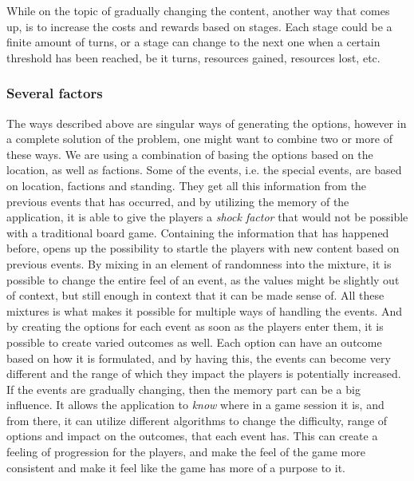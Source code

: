 While on the topic of gradually changing the content, another way that comes up, is to increase the costs and rewards based on stages.
Each stage could be a finite amount of turns, or a stage can change to the next one when a certain threshold has been reached, be it turns, resources gained, resources lost, etc.

\subsubsection{Several factors}
The ways described above are singular ways of generating the options, however in a complete solution of the problem, one might want to combine two or more of these ways. 
We are using a combination of basing the options based on the location, as well as factions. Some of the events, i.e. the special events, are based on location, factions and standing. They get all this information from the previous events that has occurred, and by utilizing the memory of the application, it is able to give the players a \textit{shock factor} that would not be possible with a traditional board game. Containing the information that has happened before, opens up the possibility to startle the players with new content based on previous events. 
By mixing in an element of randomness into the mixture, it is possible to change the entire feel of an event, as the values might be slightly out of context, but still enough in context that it can be made sense of. All these mixtures is what makes it possible for multiple ways of handling the events. And by creating the options for each event as soon as the players enter them, it is possible to create varied outcomes as well. Each option can have an outcome based on how it is formulated, and by having this, the events can become very different and the range of which they impact the players is potentially increased. 
If the events are gradually changing, then the memory part can be a big influence. It allows the application to \textit{know} where in a game session it is, and from there, it can utilize different algorithms to change the difficulty, range of options and impact on the outcomes, that each event has. This can create a feeling of progression for the players, and make the feel of the game more consistent and make it feel like the game has more of a purpose to it.



